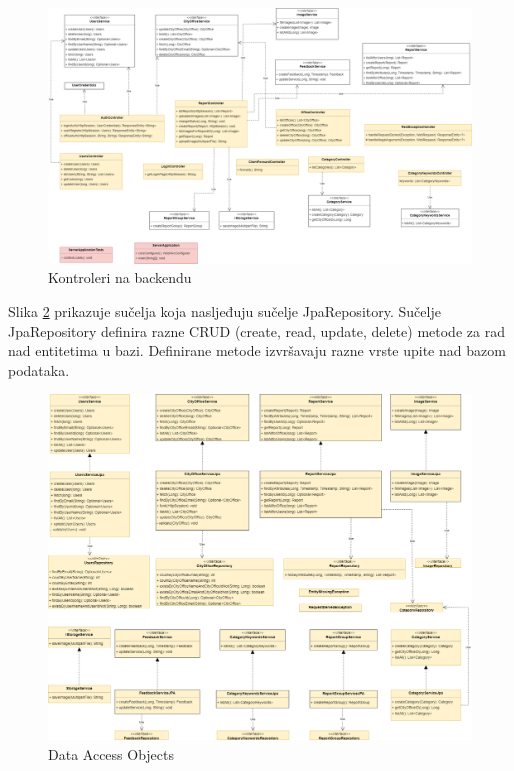 			\begin{figure}[H]
				\includegraphics[width=\textwidth]{slike/controller.png} %
				\caption{Kontroleri na backendu}
				\label{fig:kontroler} %
			\end{figure}
			
			\eject
			
			Slika \ref{fig:dao} prikazuje sučelja koja nasljeđuju sučelje JpaRepository. Sučelje JpaRepository definira razne CRUD (create, read, update, delete) metode za rad nad entitetima u bazi. Definirane metode izvršavaju razne vrste upite nad bazom podataka.
			
			\begin{figure}[H]
				\includegraphics[width=\textwidth]{slike/dao.png} %
				\caption{Data Access Objects}
				\label{fig:dao} %
			\end{figure}
			
